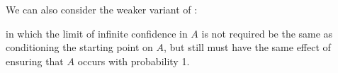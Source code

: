     We can also consider the weaker variant of :
    in which the limit of infinite confidence in $A$ is not required be the same as conditioning the starting point on $A$, but still must have the same effect of ensuring that $A$ occurs with probability 1.

